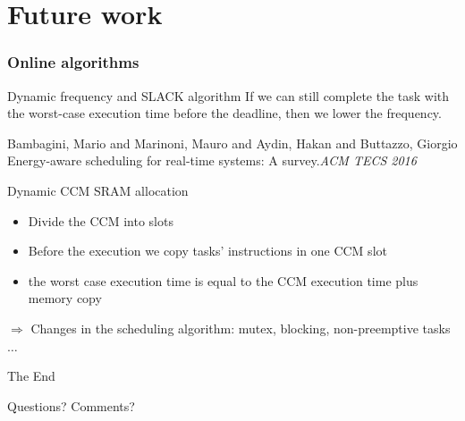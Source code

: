 \documentclass[
	11pt, %
]{beamer}
\begin{document}
\section{Future work}
\begin{frame}
	\frametitle{Online algorithms}
	\begin{block}{Dynamic frequency and SLACK algorithm}
		If we can still complete the task with the worst-case execution time before the deadline, then we lower the frequency. 
		\begin{thebibliography}{10}
			{\tiny
			\bibitem{} Bambagini, Mario and Marinoni, Mauro and Aydin, Hakan and Buttazzo, Giorgio
			\newblock Energy-aware scheduling for real-time systems: A survey.{\em{ACM TECS 2016}}
			}
		\end{thebibliography}
	\end{block}
	\begin{block}{Dynamic CCM SRAM allocation}
		\begin{itemize}
			\item Divide the CCM into slots
			\item Before the execution we copy tasks' instructions in one CCM slot
			\item the worst case execution time is equal to the CCM execution time plus memory copy
			
		\end{itemize}
		$\Rightarrow$ Changes in the scheduling algorithm: mutex, blocking, non-preemptive tasks $\ldots$

	\end{block}
\end{frame}





\begin{frame}[plain] %
	\begin{center}
		{\Huge The End}
		
		\bigskip\bigskip %
		
		{\LARGE Questions? Comments?}
	\end{center}
\end{frame}

\end{document}
